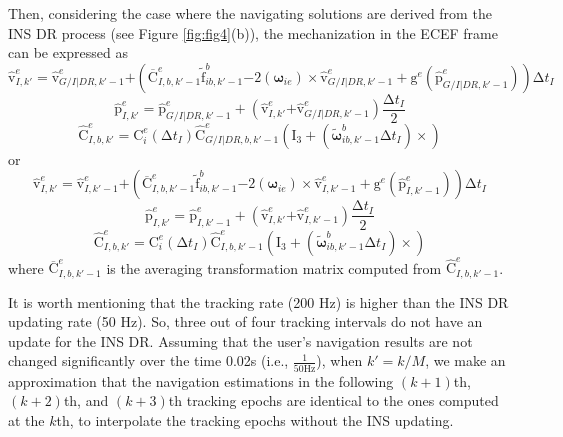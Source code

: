 \documentclass{article}
\newcommand{\reffig}[1]{Figure \ref{#1}}
\begin{document}
Then, considering the case where the navigating solutions are derived from the INS DR process (see \reffig{fig:fig4}(b)), the mechanization in the ECEF frame can be expressed as
\[{\hat{\boldsymbol{\mathrm{v}}}}^e_{I,k'}={\hat{\boldsymbol{\mathrm{v}}}}^e_{G/I|DR,k'-1}\boldsymbol{+}\left({\overline{\boldsymbol{\mathrm{C}}}}^e_{I,b,k'-1}{\tilde{\boldsymbol{\mathrm{f}}}}^b_{ib,k'-1}\boldsymbol{-}2\left({\boldsymbol{\omega }}_{ie}\right)\times {\hat{\boldsymbol{\mathrm{v}}}}^e_{G/I|DR,k'-1}+{\boldsymbol{\mathrm{g}}}^e\left({\hat{\boldsymbol{\mathrm{p}}}}^e_{G/I|DR,k'-1}\right)\right)\mathrm{\Delta }t_I\] 
\[{\hat{\boldsymbol{\mathrm{p}}}}^e_{I,k'}\boldsymbol{=}{\hat{\boldsymbol{\mathrm{p}}}}^e_{G/I|DR,k'-1}+\left({\hat{\boldsymbol{\mathrm{v}}}}^e_{I,k'}\boldsymbol{+}{\hat{\boldsymbol{\mathrm{v}}}}^e_{G/I|DR,k'-1}\right)\frac{\mathrm{\Delta }t_I}{2}\] 
\[{\hat{\boldsymbol{\mathrm{C}}}}^e_{I,b,k'}\boldsymbol{=}{\boldsymbol{\mathrm{C}}}^e_i\left(\mathrm{\Delta }t_I\right){\hat{\boldsymbol{\mathrm{C}}}}^e_{G/I|DR,b,k'-1}\left({\boldsymbol{\mathrm{I}}}_3+\left({\tilde{\boldsymbol{\omega }}}^b_{ib,k'-1}\mathrm{\Delta }t_I\right)\times \right)\] 
or
\[{\hat{\boldsymbol{\mathrm{v}}}}^e_{I,k'}={\hat{\boldsymbol{\mathrm{v}}}}^e_{I,k'-1}\boldsymbol{+}\left({\overline{\boldsymbol{\mathrm{C}}}}^e_{I,b,k'-1}{\tilde{\boldsymbol{\mathrm{f}}}}^b_{ib,k'-1}\boldsymbol{-}2\left({\boldsymbol{\omega }}_{ie}\right)\times {\hat{\boldsymbol{\mathrm{v}}}}^e_{I,k'-1}+{\boldsymbol{\mathrm{g}}}^e\left({\hat{\boldsymbol{\mathrm{p}}}}^e_{I,k'-1}\right)\right)\mathrm{\Delta }t_I\] 
\[{\hat{\boldsymbol{\mathrm{p}}}}^e_{I,k'}\boldsymbol{=}{\hat{\boldsymbol{\mathrm{p}}}}^e_{I,k'-1}+\left({\hat{\boldsymbol{\mathrm{v}}}}^e_{I,k'}\boldsymbol{+}{\hat{\boldsymbol{\mathrm{v}}}}^e_{I,k'-1}\right)\frac{\mathrm{\Delta }t_I}{2}\] 
\[{\hat{\boldsymbol{\mathrm{C}}}}^e_{I,b,k'}\boldsymbol{=}{\boldsymbol{\mathrm{C}}}^e_i\left(\mathrm{\Delta }t_I\right){\hat{\boldsymbol{\mathrm{C}}}}^e_{I,b,k'-1}\left({\boldsymbol{\mathrm{I}}}_3+\left({\tilde{\boldsymbol{\omega }}}^b_{ib,k'-1}\mathrm{\Delta }t_I\right)\times \right)\] 
where ${\overline{\boldsymbol{\mathrm{C}}}}^e_{I,b,k'-1}$ is the averaging transformation matrix computed from ${\hat{\boldsymbol{\mathrm{C}}}}^e_{I,b,k'-1}$. 

It is worth mentioning that the tracking rate (200 Hz) is higher than the INS DR updating rate (50 Hz). So, three out of four tracking intervals do not have an update for the INS DR. Assuming that the user's navigation results are not changed significantly over the time 0.02s (i.e., $\frac{1}{50\mathrm{Hz}}$), when $k'=k/M$, we make an approximation that the navigation estimations in the following $\left(k+1\right)$th, $(k+2)$th, and $\left(k+3\right)$th tracking epochs are identical to the ones computed at the $k$th, to interpolate the tracking epochs without the INS updating.
\end{document}
